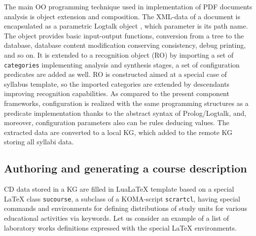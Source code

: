 \documentclass[
]{aiitart}
\providecommand{\LuaLaTeX}{Lua\LaTeX}
\begin{document}
The main OO programming technique used in implementation of PDF documents analysis is object extension and composition.  The XML-data of a document is encapsulated as a parametric Logtalk object \cite{logtalk}, which parameter is its path name.  The object provides basic input-output functions, conversion from a tree to the database, database content modification conserving consistency, debug printing, and so on.  It is extended to a recognition object (RO) by importing a set of \verb|categories| implementing analysis and synthesis stages, a set of configuration predicates are added as well.  RO is constructed aimed at a special case of syllabus template, so the imported categories are extended by descendants improving recognition capabilities.  As compared to the present component frameworks, configuration is realized with the same programming structures as a predicate implementation thanks to the abstract syntax of Prolog/Logtalk, and, moreover, configuration parameters also can be rules deducing values.  The extracted data are converted to a local KG, which added to the remote KG storing all syllabi data.

\subsection{Authoring and generating a course description}

CD data stored in a KG are filled in \LuaLaTeX{} template based on a special \LaTeX{} class \verb|sucourse|, a subclass of a KOMA-script \verb|scrartcl|, having special commands and environments for defining distributions of study units for various educational activities via keywords.  Let us consider an example of a list of laboratory works definitions expressed with the special \LaTeX{} environments.
\end{document}
